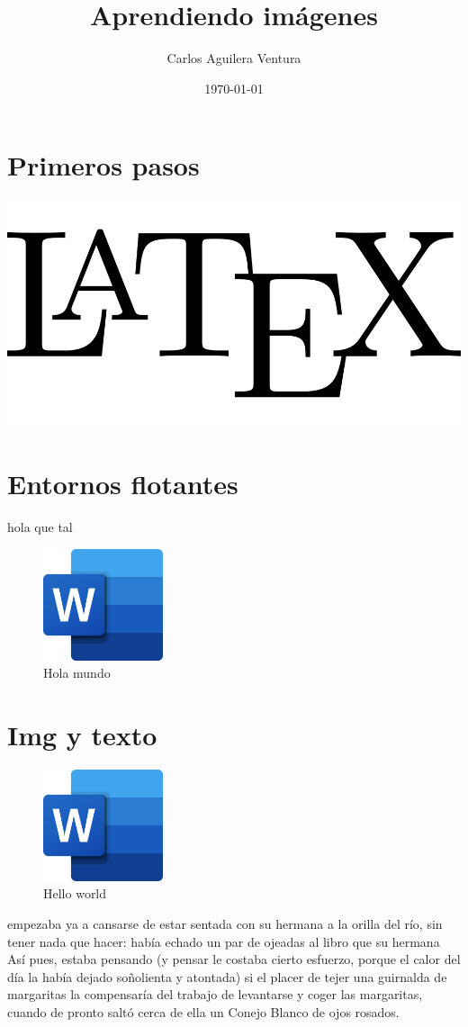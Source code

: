 \documentclass[a4paper]{article}
\title{Aprendiendo imágenes}
\author{Carlos Aguilera Ventura}
\date{\today}
\begin{document}
\maketitle \tableofcontents \listoffigures \newpage

\section{Primeros pasos}
\includegraphics[width=\textwidth]{logolatex.png}


\section{Entornos flotantes}
hola que tal
\begin{figure}[!ht]
\centering
\includegraphics[width=100pt]{word.png}
\caption{Hola mundo}
\end{figure}

\section{Img y texto}
\begin{figure}
\includegraphics[width=100pt]{word.png}
\caption{Hello world}
\end{figure}


empezaba ya a cansarse de estar sentada con su
hermana a la orilla del río, sin tener nada que hacer:
había echado un par de ojeadas al libro que su hermana
Así pues, estaba pensando ({\tiny y pensar le costaba cierto
    esfuerzo, porque el calor del día la había dejado
soñolienta y atontada}) si el placer de tejer una
guirnalda de margaritas la compensaría del trabajo de
levantarse y coger las margaritas, cuando de pronto
saltó cerca de ella un Conejo Blanco de ojos rosados.
\end{document}
